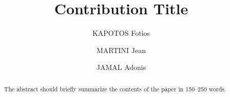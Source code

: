 \documentclass[runningheads]{llncs}
\begin{document}
\title{Contribution Title}
\author{KAPOTOS Fotios \and
MARTINI Jean \and
JAMAL Adonis}
\maketitle              %
%
\begin{abstract}
The abstract should briefly summarize the contents of the paper in
150--250 words.
\end{abstract}
%
%
%


%
%
%
% 
% 
%




\end{document}
